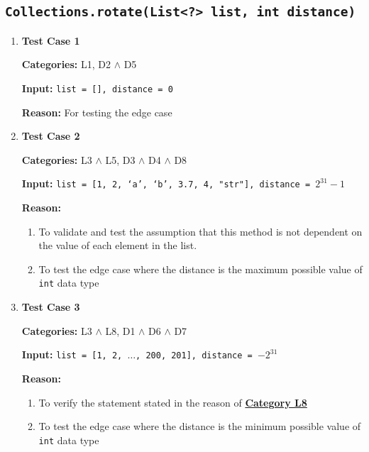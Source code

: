 \documentclass[12pt, a4paper]{article}
\newcounter{category}[subsection]
\begin{document}
\subsection{\texttt{Collections.rotate(List<?> list, int distance)}}
\begin{enumerate}
  \item \textbf{Test Case 1}
  \par\quad\textbf{Categories:} L1, D2 $\wedge$ D5
  \par\quad\textbf{Input:} \texttt{list = [], distance = 0}
  \par\quad\textbf{Reason:} For testing the edge case

  \item \textbf{Test Case 2}
  \par\quad\textbf{Categories:} L3 $\wedge$ L5, D3 $\wedge$ D4 $\wedge$ D8
  \par\quad\textbf{Input:} \texttt{list = [1, 2, `a', `b', 3.7, 4, "str"], distance = $2^{31} - 1$}
  \par\quad\textbf{Reason:}
  \begin{enumerate}
    \item To validate and test the assumption that this method is not dependent on
    the value of each element in the list.
    \item To test the edge case where the distance is the maximum possible value of \texttt{int}
    data type
  \end{enumerate}

  \item \textbf{Test Case 3}
  \par\quad\textbf{Categories:} L3 $\wedge$ L8, D1 $\wedge$ D6 $\wedge$ D7
  \par\quad\textbf{Input:} \texttt{list = [1, 2, $\dots$, 200, 201], distance = $-2^{31}$}
  \par\quad\textbf{Reason:}
  \begin{enumerate}
    \item To verify the statement stated in the reason of \hyperref[category:l8]{\textbf{Category L8}}
    \item To test the edge case where the distance is the minimum possible value of \texttt{int}
    data type
  \end{enumerate}
\end{enumerate}
\end{document}
